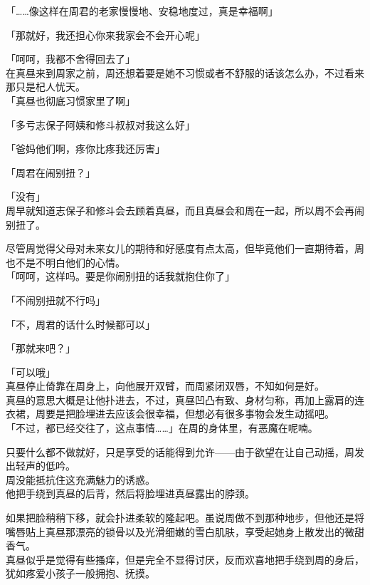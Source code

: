 「……像这样在周君的老家慢慢地、安稳地度过，真是幸福啊」

「那就好，我还担心你来我家会不会开心呢」

「呵呵，我都不舍得回去了」\\

在真昼来到周家之前，周还想着要是她不习惯或者不舒服的话该怎么办，不过看来那只是杞人忧天。\\

「真昼也彻底习惯家里了啊」

「多亏志保子阿姨和修斗叔叔对我这么好」

「爸妈他们啊，疼你比疼我还厉害」

「周君在闹别扭？」

「没有」\\

周早就知道志保子和修斗会去顾着真昼，而且真昼会和周在一起，所以周不会再闹别扭了。

尽管周觉得父母对未来女儿的期待和好感度有点太高，但毕竟他们一直期待着，周也不是不明白他们的心情。\\

「呵呵，这样吗。要是你闹别扭的话我就抱住你了」

「不闹别扭就不行吗」

「不，周君的话什么时候都可以」

「那就来吧？」

「可以哦」\\

真昼停止倚靠在周身上，向他展开双臂，而周紧闭双唇，不知如何是好。\\

真昼的意思大概是让他扑进去，不过，真昼凹凸有致、身材匀称，再加上露肩的连衣裙，周要是把脸埋进去应该会很幸福，但想必有很多事物会发生动摇吧。\\

「不过，都已经交往了，这点事情……」在周的身体里，有恶魔在呢喃。

只要什么都不做就好，只是享受的话能得到允许——由于欲望在让自己动摇，周发出轻声的低吟。\\

周没能抵抗住这充满魅力的诱惑。\\

他把手绕到真昼的后背，然后将脸埋进真昼露出的脖颈。

如果把脸稍稍下移，就会扑进柔软的隆起吧。虽说周做不到那种地步，但他还是将嘴唇贴上真昼那漂亮的锁骨以及光滑细嫩的雪白肌肤，享受起她身上散发出的微甜香气。\\

真昼似乎是觉得有些搔痒，但是完全不显得讨厌，反而欢喜地把手绕到周的身后，犹如疼爱小孩子一般拥抱、抚摸。\\


